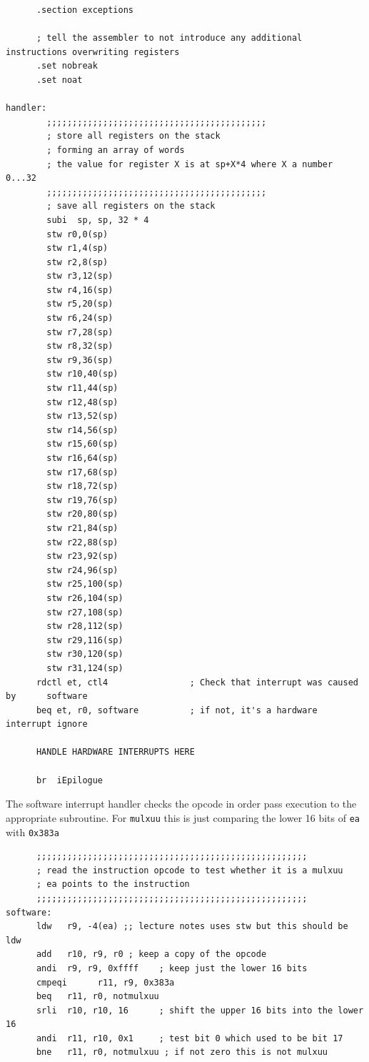 \documentclass[../notes.tex]{subfiles}
\begin{document}
\begin{listing}[H]
\begin{verbatim}
      .section exceptions
 
      ; tell the assembler to not introduce any additional instructions overwriting registers
      .set nobreak
      .set noat
 
handler:                                                                       
        ;;;;;;;;;;;;;;;;;;;;;;;;;;;;;;;;;;;;;;;;;;;
        ; store all registers on the stack
        ; forming an array of words
        ; the value for register X is at sp+X*4 where X a number 0...32
        ;;;;;;;;;;;;;;;;;;;;;;;;;;;;;;;;;;;;;;;;;;;
        ; save all registers on the stack
        subi  sp, sp, 32 * 4
        stw r0,0(sp)
        stw r1,4(sp)
        stw r2,8(sp)
        stw r3,12(sp)
        stw r4,16(sp)
        stw r5,20(sp)
        stw r6,24(sp)
        stw r7,28(sp)
        stw r8,32(sp)
        stw r9,36(sp)
        stw r10,40(sp)
        stw r11,44(sp)
        stw r12,48(sp)
        stw r13,52(sp)
        stw r14,56(sp)
        stw r15,60(sp)
        stw r16,64(sp)
        stw r17,68(sp)
        stw r18,72(sp)
        stw r19,76(sp)
        stw r20,80(sp)
        stw r21,84(sp)
        stw r22,88(sp)
        stw r23,92(sp)
        stw r24,96(sp)
        stw r25,100(sp)
        stw r26,104(sp)
        stw r27,108(sp)
        stw r28,112(sp)
        stw r29,116(sp)
        stw r30,120(sp)
        stw r31,124(sp)
      rdctl et, ctl4                ; Check that interrupt was caused by      software
      beq et, r0, software          ; if not, it's a hardware interrupt ignore
     
      HANDLE HARDWARE INTERRUPTS HERE
 
      br  iEpilogue

\end{verbatim}
\end{listing}

The software interrupt handler checks the opcode in order pass execution to the appropriate subroutine. For \texttt{mulxuu} this is just comparing the lower 16 bits of \texttt{ea} with \texttt{0x383a}

\begin{listing}[H]
\begin{verbatim}
      ;;;;;;;;;;;;;;;;;;;;;;;;;;;;;;;;;;;;;;;;;;;;;;;;;;;;;
      ; read the instruction opcode to test whether it is a mulxuu
      ; ea points to the instruction
      ;;;;;;;;;;;;;;;;;;;;;;;;;;;;;;;;;;;;;;;;;;;;;;;;;;;;;
software:
      ldw   r9, -4(ea) ;; lecture notes uses stw but this should be ldw
      add   r10, r9, r0 ; keep a copy of the opcode
      andi  r9, r9, 0xffff    ; keep just the lower 16 bits
      cmpeqi      r11, r9, 0x383a
      beq   r11, r0, notmulxuu
      srli  r10, r10, 16      ; shift the upper 16 bits into the lower 16
      andi  r11, r10, 0x1     ; test bit 0 which used to be bit 17
      bne   r11, r0, notmulxuu ; if not zero this is not mulxuu

\end{verbatim}
\end{listing}
\end{document}

